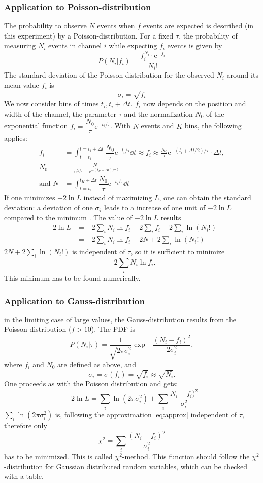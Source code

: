 \documentclass[english,  %
parskip=full,   %
headsepline]{scrartcl}
\newcommand{\e}{\mathrm{e}}
\begin{document}
\subsubsection{Application to Poisson-distribution}
The probability to observe $N$ events when $f$ events are expected is described (in this experiment) by a Poisson-distribution. For a fixed $\tau$, the probability of measuring $N_i$ events in channel $i$ while expecting $f_i$ events is given by
\[
P(N_i|f_i)=\dfrac{f_i^{N_i}\cdot\e^{-f_i}}{N_i!}
\]
The standard deviation of the Poisson-distribution for the observed $N_i$ around its mean value $f_i$ is
\[
\sigma_i=\sqrt{f_i}
\]
We now consider bins of times $t_i, t_i+\Delta t$. $f_i$ now depends on the position and width of the channel, the parameter $\tau$ and the normalization $N_0$ of the exponential function $f_i=\dfrac{N_0}{\tau}\e^{-t_i/\tau}$. With $N$ events and $K$ bins, the following applies:
\begin{align}
    f_i&=\int_{t=t_i}^{t=t_i+\Delta t}\dfrac{N_0}{\tau}\e^{-t_i/\tau}\dd t\approx f_i\approx\frac{N_0}{\tau}\e^{-(t_i+\Delta t/2)/\tau}\cdot\Delta t, \\
N_0&=\frac{N}{\e^{t_1/\tau}-\e^{-(t_K+\Delta t)/\tau}},\\
\text{and }N&=\int_{t=t_1}^{t_K+\Delta t}\dfrac{N_0}{\tau}\e^{-t_i/\tau}\dd t
\end{align}
If one minimizes $-2\ln L$ instead of maximizing $L$, one can obtain the standard deviation: a deviation of one $\sigma_\hat{\tau}$ leads to a increase of one unit of $-2\ln L$ compared to the minimum \cite{stats}.
The value of $-2\ln L$ results %
\begin{align}
    -2\ln L&=-2\sum_iN_i\ln f_i+2\sum_if_i+2\sum_i\ln(N_i!)\\
    &=-2\sum_iN_i\ln f_i+2N+2\sum_i\ln(N_i!)
\end{align}
$2N+2\sum_i\ln(N_i!)$ is independent of $\tau$, so it is sufficient to minimize
\[
-2\sum_iN_i\ln f_i.
\]
This minimum has to be found numerically.
\subsubsection{Application to Gauss-distribution}
in the limiting case of large values, the Gauss-distribution results from the Poisson-distribution ($f>10$). The PDF is
\[
P(N_i|\tau)=\dfrac{1}{\sqrt{2\pi\sigma_i^2}}\exp{-\dfrac{(N_i-f_i)^2}{2\sigma_i^2}},
\]
where $f_i$ and $N_0$ are defined as above, and
\[\sigma_i=\sigma(f_i)=\sqrt{f_i}\approx\sqrt{N_i}\label{eq:approx}.\] One proceeds as with the Poisson distribution and gets:
\[
-2\ln L = \sum_i\ln(2\pi\sigma_i^2)+\sum_i\frac{N_i-f_i)^2}{\sigma_i^2}
\]
$\sum_i\ln(2\pi\sigma_i^2)$ is, following the approximation \cref{eq:approx} independent of $\tau$, therefore only
\[
\chi^2=\sum_i\frac{(N_i-f_i)^2}{\sigma_i^2}
\]
has to be minimized. This is called $\chi^2$-method. This function should follow the $\chi^2$-distribution for Gaussian  distributed random variables, which can be checked with a table. 
\end{document}
